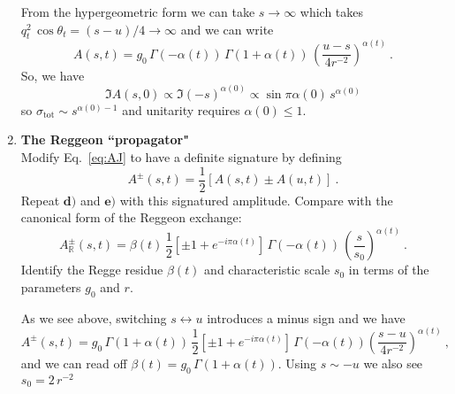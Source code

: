 \begin{enumerate}
          \begin{solution}
              From the hypergeometric form we can take $s\to \infty$ which takes $q_t^2 \, \cos\theta_t = (s-u)/4 \to \infty$ and we can write
              \begin{equation}
                  A(s,t) = g_0 \, \Gamma(-\alpha(t)) \, \Gamma(1+\alpha(t)) \, \left(\frac{u-s}{4r^{-2}}\right)^{\alpha(t)} ~.
              \end{equation}
              So, we have
              \begin{equation}
                  \Im A(s,0) \propto \Im (-s)^{\alpha(0)} \propto \sin \pi \alpha(0) \, s^{\alpha(0)}
              \end{equation}
              so $\sigma_\text{tot} \sim s^{\alpha(0)-1}$ and unitarity requires $\alpha(0) \leq 1$.
          \end{solution}

    \item \textbf{The Reggeon ``propagator"} \\
          Modify Eq.~\ref{eq:AJ} to have a definite signature by defining
          \begin{equation}
              A^{\pm}(s,t) = \frac{1}{2}\left[A(s,t) \pm A(u,t) \right]~.
          \end{equation}
          Repeat $\textbf{d)}$ and  $\textbf{e)}$ with this signatured amplitude. Compare with the canonical form of the Reggeon exchange:
          \begin{equation}
              A^\pm_\mathbb{R}(s,t) = \beta(t) \, \frac{1}{2}\left[\pm1 + e^{-i\pi\alpha(t)}\right] \, \Gamma(-\alpha(t)) \, \left(\frac{s}{s_0}\right)^{\alpha(t)} ~.
          \end{equation}
          Identify the Regge residue $\beta(t)$ and characteristic scale $s_0$ in terms of the parameters $g_0$ and $r$.

          \begin{solution}
              As we see above, switching $s\leftrightarrow u$ introduces a minus sign and we have
              \begin{equation}
                  A^\pm(s,t) = g_0 \, \Gamma(1+\alpha(t)) \, \frac{1}{2}[\pm1 + e^{-i\pi\alpha(t)}] \, \Gamma(-\alpha(t)) \left(\frac{s-u}{4r^{-2}}\right)^{\alpha(t)} ~,
              \end{equation}
              and we can read off $\beta(t) = g_0 \, \Gamma(1+\alpha(t))$. Using $s \sim -u$ we also see $s_0 = 2 \, r^{-2}$


\end{solution}
\end{enumerate}
